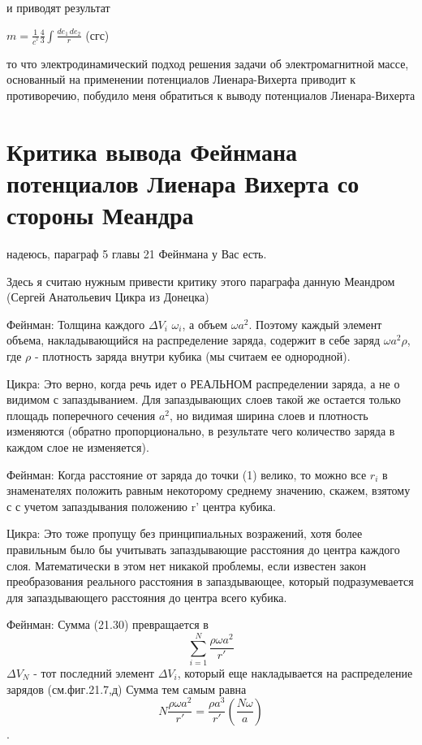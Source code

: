 \documentclass{article}
\begin{document}
и приводят результат 

$m =\frac{1}{{{c}^{^{2}}}}\frac{4}{3}\int\frac{de_1\,de_2}{r}$ (сгс)

то что электродинамический подход решения задачи об электромагнитной массе, основанный на применении потенциалов Лиенара-Вихерта приводит к противоречию, побудило меня обратиться к выводу потенциалов Лиенара-Вихерта 

\section{Критика вывода Фейнмана потенциалов Лиенара Вихерта со стороны Меандра}

надеюсь, параграф 5 главы 21 Фейнмана \cite{Feinman} у Вас есть.

Здесь я считаю нужным привести критику этого параграфа данную Меандром (Сергей Анатольевич Цикра из Донецка) \cite{meandr}

Фейнман:
Толщина каждого $\Delta V_i$   $\omega_i$, а объем  $\omega a^2$.
Поэтому каждый элемент объема, накладывающийся на распределение заряда, содержит в себе заряд $\omega a^2\rho$, где $\rho$ - плотность заряда внутри кубика (мы считаем ее однородной).


Цикра:
Это верно, когда речь идет о РЕАЛЬНОМ распределении заряда, а не о видимом с запаздыванием. Для запаздывающих слоев такой же остается только площадь поперечного сечения $a^2$, но видимая ширина слоев и плотность изменяются (обратно пропорционально, в результате чего количество заряда в каждом слое не изменяется).

Фейнман:
Когда расстояние от заряда до точки (1) велико, то можно все $r_i$ в знаменателях положить равным некоторому среднему значению, скажем, взятому с с учетом запаздывания положению r' центра кубика.


Цикра:
Это тоже пропущу без принципиальных возражений, хотя более правильным было бы учитывать запаздывающие расстояния до центра каждого слоя. Математически в этом нет никакой проблемы, если известен закон преобразования реального расстояния в запаздывающее, который подразумевается для запаздывающего расстояния до центра всего кубика.

Фейнман:
Сумма (21.30) превращается в 
$$\sum\limits_{i=1}^N \frac{\rho \omega a^2}{r'}$$
$\Delta V_N$ - тот последний элемент $\Delta V_i$, который еще накладывается на распределение зарядов (см.фиг.21.7,д)
Сумма тем самым равна
$$N\frac{\rho \omega a^2}{r'}=\frac{\rho a^3}{r'}\left (\frac{N\omega}{a}\right )$$.
\end{document}

